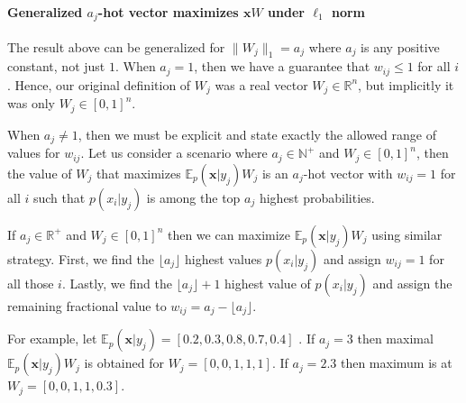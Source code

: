 \documentclass[12pt]{article}
\begin{document}
\paragraph{Generalized $a_j$-hot vector maximizes $\boldsymbol{x}W$ under $\ell_1$ norm}
The result above can be generalized for $\lVert W_j \rVert_1 = a_j$ where $a_j$ is any positive constant, not just $1$. When $a_j=1$, then we have a guarantee that $w_{ij}\le 1$ for all $i$. Hence, our original definition of $W_j$ was a real vector $W_j\in \mathbb{R}^n$, but implicitly it was only $W_j\in [0,1]^n$. 

When $a_j\ne 1$, then we must be explicit and state exactly the allowed range of values for $w_{ij}$. Let us consider a scenario where $a_j\in\mathbb{N}^+$ and $W_j\in [0,1]^n$, then the value of $W_j$ that maximizes $\mathbb{E}_{p}(\boldsymbol{x}|y_j)W_j$ is an $a_j$-hot vector with $w_{ij}=1$ for all $i$ such that $p(x_i|y_j)$ is among the top $a_j$ highest probabilities. 

If $a_j\in\mathbb{R}^+$ and $W_j\in [0,1]^n$ then we can maximize $\mathbb{E}_{p}(\boldsymbol{x}|y_j)W_j$ using similar strategy. First, we find the $\lfloor a_j \rfloor$ highest values $p(x_i|y_j)$ and assign $w_{ij}=1$ for all those $i$. Lastly, we find the $\lfloor a_j \rfloor+1$ highest value of $p(x_i|y_j)$ and assign the remaining fractional value to $w_{ij}=a_j - \lfloor a_j \rfloor$. 

For example, let 
$\mathbb{E}_{p}(\boldsymbol{x}|y_j) = [0.2,0.3,0.8,0.7,0.4]$ . If $a_j=3$ then maximal $\mathbb{E}_{p}(\boldsymbol{x}|y_j)W_j$ is obtained for 
$W_j=[0,0,1,1,1]$. If $a_j=2.3$ then maximum is at $W_j=[0,0,1,1,0.3]$.
\end{document}

